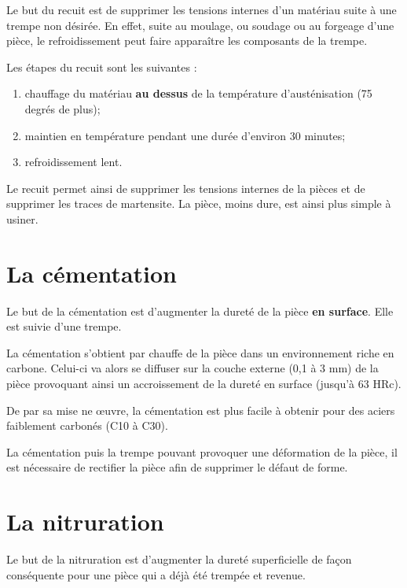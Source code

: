 \documentclass[11pt,oneside]{article}
\begin{document}
\begin{obj}
Le but du recuit est de supprimer les tensions internes d'un matériau suite à une trempe non désirée. En effet, suite au moulage, ou soudage ou au forgeage d'une pièce, le refroidissement peut faire apparaître les composants de la trempe. 
\end{obj}

Les étapes du recuit sont les suivantes :
\begin{enumerate}
\item chauffage du matériau \textbf{au dessus} de la température d'austénisation (75 degrés de plus);
\item maintien en température pendant une durée d'environ 30 minutes;
\item refroidissement lent.
\end{enumerate}

Le recuit permet ainsi de supprimer les tensions internes de la pièces et de supprimer les traces de martensite. La pièce, moins dure, est ainsi plus simple à usiner.


\section{La cémentation}
\begin{obj}
Le but de la cémentation est d'augmenter la dureté de la pièce \textbf{en surface}. Elle est suivie d'une trempe.
\end{obj}

La cémentation s'obtient par chauffe de la pièce dans un environnement riche en carbone. Celui-ci va alors se diffuser sur la couche externe (0,1 à 3 mm) de la pièce provoquant ainsi un accroissement de la dureté en surface (jusqu'à 63 HRc). 

De par sa mise ne \oe{}uvre, la cémentation est plus facile à obtenir pour des aciers faiblement carbonés (C10 à C30). 


La cémentation puis la trempe pouvant provoquer une déformation de la pièce, il est nécessaire de rectifier la pièce afin de supprimer le défaut de forme. 

\section{La nitruration}

\begin{obj}
Le but de la nitruration est d'augmenter la dureté superficielle de façon conséquente pour une pièce qui a déjà été trempée et revenue.
\end{obj}
\end{document}
